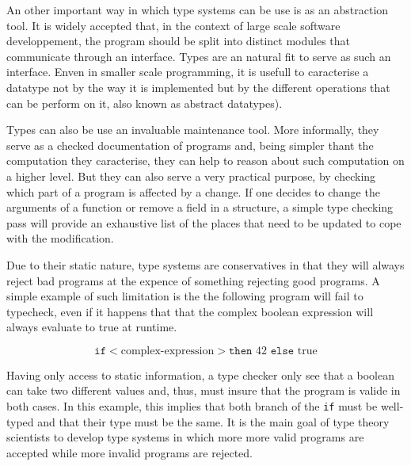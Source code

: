 \documentclass[a4paper, oneside, 12pt, titlepage]{article}
\begin{document}
An other important way in which type systems can be use is as an abstraction tool. It is widely
accepted that, in the context of large scale software developpement, the program should be split
into distinct modules that communicate through an interface. Types are an natural fit to serve as
such an interface. Enven in smaller scale programming, it is usefull to caracterise a datatype not
by the way it is implemented but by the different operations that can be perform on it, also known
as abstract datatypes).

Types can also be use an invaluable maintenance tool. More informally, they serve as a checked
documentation of programs and, being simpler thant the computation they caracterise, they can help
to reason about such computation on a higher level. But they can also serve a very practical
purpose, by checking which part of a program is affected by a change. If one decides to change the
arguments of a function or remove a field in a structure, a simple type checking pass will provide
an exhaustive list of the places that need to be updated to cope with the modification.


Due to their static nature, type systems are conservatives in that they will always reject bad
programs at the expence of something rejecting good programs. A simple example of such limitation is
the the following program will fail to typecheck, even if it happens that that the complex boolean
expression will always evaluate to true at runtime.

\begin{displaymath}
  \texttt{if} <\text{complex-expression}> \texttt{then } 42 \texttt{ else } \text{true}
\end{displaymath}

Having only access to static information, a type checker only see that a boolean can take two
different values and, thus, must insure that the program is valide in both cases. In this example,
this implies that both branch of the \texttt{if} must be well-typed and that their type must be the
same. It is the main goal of type theory scientists to develop type systems in which more more valid
programs are accepted while more invalid programs are rejected.
\end{document}
